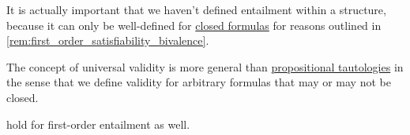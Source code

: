 \begin{comments}
  \item It is actually important that we haven't defined entailment within a structure, because it can only be well-defined for \hyperref[def:first_order_syntax/closed_formula]{closed formulas} for reasons outlined in \cref{rem:first_order_satisfiability_bivalence}.

  \item The concept of universal validity is more general than \hyperref[def:propositional_tautology]{propositional tautologies} in the sense that we define validity for arbitrary formulas that may or may not be closed.

  \item {} hold for first-order entailment as well.
\end{comments}

